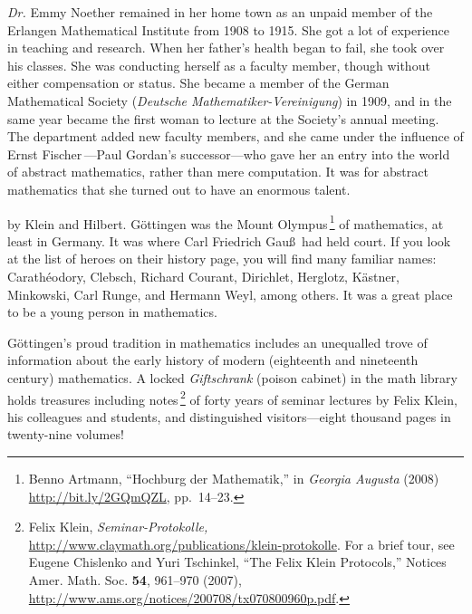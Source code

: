 \documentclass[twoside,symmetric]{tufte-handout}
\begin{document}
\emph{Dr.} Emmy Noether remained in her home town as an unpaid member of the Erlangen Mathematical Institute from 1908 to 1915. She got a lot of experience in teaching and research. When her father's health began to fail, she took over his classes. She was conducting herself as a faculty member, though without either compensation or status. She became a member of the German Mathematical Society (\emph{Deutsche Mathematiker-Vereinigung}) in 1909, and in the same year became the first woman to lecture at the Society's annual meeting. The department added new faculty members, and she came under the influence of Ernst Fischer$\,$\cite{ernstfischer}---Paul Gordan's successor---who gave her an entry into the world of abstract mathematics, rather than mere computation. It was for abstract mathematics that she turned out to have an enormous talent.

 by Klein and Hilbert. G\"ottingen was the Mount Olympus$\,$\footnote{Benno Artmann,
``Hochburg der Mathematik,'' in \emph{Georgia Augusta} (2008) \url{http://bit.ly/2GQmQZL}, pp.~14--23.} of mathematics, at least in Germany. It was  where Carl Friedrich Gau\ss\ had held court. If you look at the list of heroes on their history page, you will find many familiar names: Carathéodory, Clebsch, Richard Courant, Dirichlet, Herglotz, Kästner, Minkowski, Carl Runge, and  Hermann Weyl, among others. It was a great place to be a young person in mathematics.

G\"ottingen's proud tradition in mathematics includes an unequalled trove of information about the early history of modern (eighteenth and nineteenth century) mathematics. A locked \emph{Giftschrank} (poison cabinet) in the math library holds treasures including notes$\,$\footnote[][-15pt]{Felix Klein, \emph{Seminar-Protokolle,} \url{http://www.claymath.org/publications/klein-protokolle}. For a brief tour, see Eugene Chislenko and Yuri Tschinkel, ``The Felix Klein Protocols,'' Notices Amer. Math. Soc. \textbf{54}, 961--970 (2007), \url{http://www.ams.org/notices/200708/tx070800960p.pdf}.} of forty years of seminar lectures by Felix Klein, his colleagues and students, and distinguished visitors---eight thousand pages in twenty-nine volumes!
\end{document}
